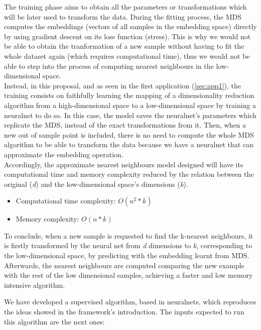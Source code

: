 \documentclass[a4paper,11pt,spanish]{report}
\begin{document}
The training phase aims to obtain all the parameters or transformations which will be later used to transform the data. During the fitting process, the MDS computes the embeddings (vectors of all samples in the embedding space) directly by using gradient descent on its loss function (stress). This is why we would not be able to obtain the tranformation of a new sample without having to fit the whole dataset again (which requires computational time), thus we would not be able to step into the process of computing nearest neighbours in the low-dimensional space.\\
Instead, in this proposal, and as seen in the first application (\ref{sec:app1}), the training consists on faithfully learning the mapping of a dimensionality reduction algorithm from a high-dimensional space to a low-dimensional space by training a neuralnet to do so. In this case, the model saves the neuralnet's parameters which replicate the MDS, instead of the exact transformations from it. Then, when a new out of sample point is included, there is no need to compute the whole MDS algorithm to be able to transform the data because we have a neuralnet that can approximate the embedding operation.\\
Accordingly, the approximate nearest neighbours model designed will have its computational time and memory complexity reduced by the relation between the original (\textit{d}) and the low-dimensional space's dimensions (\textit{k}).
\begin{itemize}
\item Computational time complexity: $O(n^{2}*k)$
\item Memory complexity: $O(n*k)$
\end{itemize}

To conclude, when a new sample is requested to find the k-nearest neighbours, it is firstly transformed by the neural net from \textit{d} dimensions to \textit{k}, corresponding to the low-dimensional space, by predicting with the embedding learnt from MDS. Afterwards, the nearest neighbours are computed comparing the new example with the rest of the low  dimensional samples, achieving a faster and low memory intensive algorithm.

\newpage
We have developed a supervised algorithm, based in neuralnets, which reproduces the ideas showed in the framework's introduction.
The inputs expected to run this algorithm are the next ones:
\end{document}
